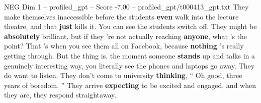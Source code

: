 \begin{textsample}{NEG Dim 1 – profiled\_gpt – Score -7.00 – profiled\_gpt/t000413\_gpt.txt}  \label{ex:f1_neg_011}
They make themselves inaccessible before the students \textbf{even} walk into the lecture theatre, and that \textbf{just} kills it.
You can see the students switch off.
They might be \textbf{absolutely} brilliant, but if they ’re not actually reaching \textbf{anyone}, what ’s the point?
That ’s when you see them all on Facebook, because \textbf{nothing} ’s really getting through.
But the thing is, the moment someone \textbf{stands} up and talks in a genuinely interesting way, you literally see the phones and laptops go away.
They do want to listen.
They don't come to university \textbf{thinking}, “ Oh good, three years of boredom. ” They arrive \textbf{expecting} to be excited and engaged, and when they are, they respond straightaway.

\end{textsample}
